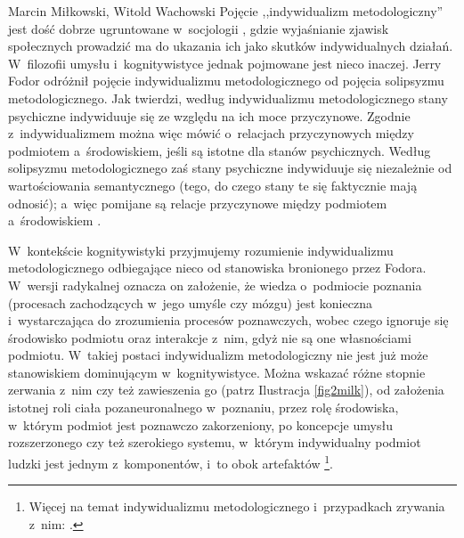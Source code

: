 \begin{artplenv2auth}{Marcin Miłkowski, Witold Wachowski}
Pojęcie ,,indywidualizm metodologiczny'' jest dość dobrze ugruntowane w~socjologii
\parencites[np.][]{schumpeter_wesen_1908}[][]{weber_gospodarka_2002}, %
 gdzie wyjaśnianie zjawisk społecznych prowadzić ma do ukazania ich jako skutków indywidualnych działań. W~filozofii umysłu i~kognitywistyce jednak pojmowane jest nieco inaczej. Jerry Fodor odróżnił pojęcie indywidualizmu metodologicznego od pojęcia solipsyzmu metodologicznego. Jak twierdzi, według indywidualizmu metodologicznego stany psychiczne indywiduuje się ze względu na ich moce przyczynowe. Zgodnie z~indywidualizmem można więc mówić o~relacjach przyczynowych między podmiotem a~środowiskiem, jeśli są istotne dla stanów psychicznych. Według solipsyzmu metodologicznego zaś stany psychiczne indywiduuje się niezależnie od wartościowania semantycznego (tego, do czego stany te się faktycznie mają odnosić); a~więc pomijane są relacje przyczynowe między podmiotem a~środowiskiem 
\parencites[][]{fodor_methodological_1980}[por. też][]{heath_methodological_2020}.%



W~kontekście kognitywistyki przyjmujemy rozumienie indywidualizmu metodologicznego odbiegające nieco od stanowiska bronionego przez Fodora. W~wersji radykalnej oznacza on założenie, że wiedza o~podmiocie poznania (procesach zachodzących w~jego umyśle czy mózgu) jest konieczna i~wystarczająca do zrozumienia procesów poznawczych, wobec czego ignoruje się środowisko podmiotu oraz interakcje z~nim, gdyż nie są one własnościami podmiotu. W~takiej postaci indywidualizm metodologiczny nie jest już może stanowiskiem dominującym w~kognitywistyce. Można wskazać różne stopnie zerwania z~nim czy też zawieszenia go (patrz Ilustracja \ref{fig2milk}), od założenia istotnej roli ciała pozaneuronalnego w~poznaniu, przez rolę środowiska, w~którym podmiot jest poznawczo zakorzeniony, po koncepcje umysłu rozszerzonego czy też szerokiego systemu, w~którym indywidualny podmiot ludzki jest jednym z~komponentów, i~to obok artefaktów 
\footnote{Więcej na temat indywidualizmu metodologicznego i~przypadkach zrywania z~nim: \parencite[][]{wachowski_poznanie_2022}.}.



\end{artplenv2auth}
